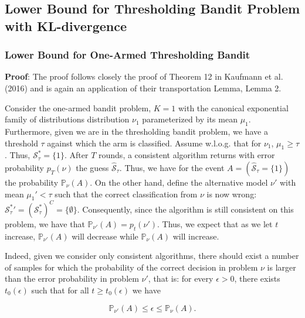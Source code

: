\documentclass[11pt,]{article}
\begin{document}
\subsection{\texorpdfstring{Lower Bound for Thresholding Bandit Problem
with KL-divergence
\label{sec:corollaryLBTBPproof}}{Lower Bound for Thresholding Bandit Problem with KL-divergence }}\label{lower-bound-for-thresholding-bandit-problem-with-kl-divergence}

\subsubsection{\texorpdfstring{Lower Bound for One-Armed Thresholding
Bandit
\label{sec:corollaryLB1TBPproof}}{Lower Bound for One-Armed Thresholding Bandit }}\label{lower-bound-for-one-armed-thresholding-bandit}

\textbf{Proof}: The proof follows closely the proof of Theorem 12 in
Kaufmann et al. (2016) and is again an application of their
transportation Lemma, Lemma 2.

Consider the one-armed bandit problem, \(K = 1\) with the canonical
exponential family of distributions distribution \(\nu_1\) parameterized
by its mean \(\mu_1\). Furthermore, given we are in the thresholding
bandit problem, we have a threshold \(\tau\) against which the arm is
classified. Assume w.l.o.g. that for \(\nu_1\), \(\mu_1 \geq \tau\).
Thus, \(\mathcal{S}_{\tau}^* = \{1\}\). After \(T\) rounds, a consistent
algorithm returns with error probability \(p_T(\nu)\) the guess
\(\hat{\mathcal{S}}_{\tau}\). Thus, we have for the event
\(A = (\hat{\mathcal{S}}_\tau = \{1\})\) the probability
\(\mathbb{P}_{\nu}(A)\). On the other hand, define the alternative model
\(\nu'\) with mean \(\mu_1' < \tau\) such that the correct
classification from \(\nu\) is now wrong:
\(\mathcal{S}_{\tau}^* {'} = (\mathcal{S}_{\tau}^*)^C = \{\emptyset\}\).
Consequently, since the algorithm is still consistent on this problem,
we have that \(\mathbb{P}_{\nu'}(A) = p_t(\nu')\). Thus, we expect that
as we let \(t\) increase, \(\mathbb{P}_{\nu'}(A)\) will decrease while
\(\mathbb{P}_{\nu}(A)\) will increase.

Indeed, given we consider only consistent algorithms, there should exist
a number of samples for which the probability of the correct decision in
problem \(\nu\) is larger than the error probability in problem
\(\nu'\), that is: for every \(\epsilon > 0\), there exists
\(t_0(\epsilon)\) such that for all \(t \geq t_0(\epsilon)\) we have

\begin{equation*}
\mathbb{P}_{\nu'}(A) \leq \epsilon \leq \mathbb{P}_{\nu}(A). \label{eq:BoundForCorollary}
\end{equation*}
\end{document}
